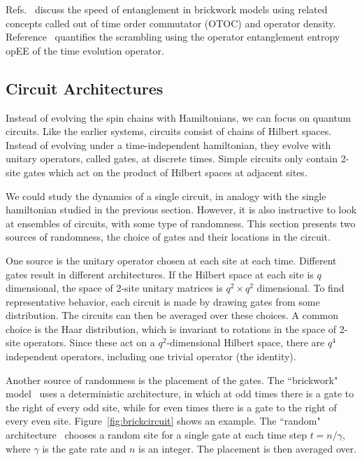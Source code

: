 Refs.~\cite{Keyserlingk, Jonay17, Jonay18, Nahum2017} discuss the speed of entanglement in brickwork models using related concepts called out of time order commutator (OTOC) and operator density. Reference~\cite{Zhou2017} quantifies the scrambling using the operator entanglement entropy opEE of the time evolution operator.

\subsection{Circuit Architectures} \label{sub:arch}

Instead of evolving the spin chains with Hamiltonians, we can focus on quantum circuits. Like the earlier systems, circuits consist of chains of Hilbert spaces. Instead of evolving under a time-independent hamiltonian, they evolve with unitary operators, called gates, at discrete times. Simple circuits only contain 2-site gates which act on the product of Hilbert spaces at adjacent sites. 

We could study the dynamics of a single circuit, in analogy with the single hamiltonian studied in the previous section. However, it is also instructive to look at ensembles of circuits, with some type of randomness. This section presents two sources of randomness, the choice of gates and their locations in the circuit.

One source is the unitary operator chosen at each site at each time. Different gates result in different architectures. 
If the Hilbert space at each site is $q$ dimensional, the space of 2-site unitary matrices is $q^2\times q^2$ dimensional. To find representative behavior, each circuit is made by drawing gates from some distribution. The circuits can then be averaged over these choices. A common choice is the Haar distribution, which is invariant to rotations in the space of 2-site operators. Since these act on a $q^2$-dimensional Hilbert space, there are $q^4$ independent operators, including one trivial operator (the identity). 

Another source of randomness is the placement of the gates. The ``brickwork" model~\cite{Keyserlingk} uses a deterministic architecture, in which at odd times there is a gate to the right of every odd site, while for even times there is a gate to the right of every even site. Figure~\ref{fig:brickcircuit} shows an example. The ``random" architecture~\cite{Nahum2017} chooses a random site for a single gate at each time step $t = n/\gamma$, where $\gamma$ is the gate rate and $n$ is an integer. The placement is then averaged over. 

